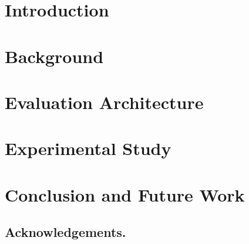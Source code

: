\documentclass[runningheads]{llncs}
\begin{document}
\section{Introduction}
\section{Background}
\section{Evaluation Architecture}
\section{Experimental Study}
\section{Conclusion and Future Work}
\subsection*{Acknowledgements.}
%


%
\end{document}
